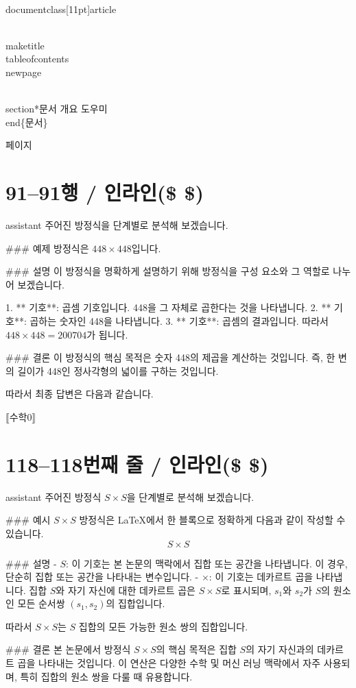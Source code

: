 \\documentclass[11pt]{article}
\begin{document}
\\maketitle
\\tableofcontents
\\newpage

\\section*{문서 개요}
도우미
\\end\{문서\}

\새 페이지

\section*{91–91행 / 인라인(\$ \$) }
assistant
주어진 방정식을 단계별로 분석해 보겠습니다.

### 예제
방정식은 \(448 \times 448\)입니다.

### 설명
이 방정식을 명확하게 설명하기 위해 방정식을 구성 요소와 그 역할로 나누어 보겠습니다.

1. ** 기호**: 곱셈 기호입니다. 448을 그 자체로 곱한다는 것을 나타냅니다.
2. ** 기호**: 곱하는 숫자인 448을 나타냅니다.
3. ** 기호**: 곱셈의 결과입니다. 따라서 \(448 \times 448 = 200704\)가 됩니다.

### 결론
이 방정식의 핵심 목적은 숫자 448의 제곱을 계산하는 것입니다. 즉, 한 변의 길이가 448인 정사각형의 넓이를 구하는 것입니다.

따라서 최종 답변은 다음과 같습니다.

⟦수학0⟧

\section*{118–118번째 줄 / 인라인(\$ \$) }
assistant
주어진 방정식 \( S \times S \)을 단계별로 분석해 보겠습니다.

### 예시
\( S \times S \) 방정식은 LaTeX에서 한 블록으로 정확하게 다음과 같이 작성할 수 있습니다.
\[ S \times S \]

### 설명
- \( S \): 이 기호는 본 논문의 맥락에서 집합 또는 공간을 나타냅니다. 이 경우, 단순히 집합 또는 공간을 나타내는 변수입니다.
- \( \times \): 이 기호는 데카르트 곱을 나타냅니다. 집합 \( S \)와 자기 자신에 대한 데카르트 곱은 \( S \times S \)로 표시되며, \( s_1 \)와 \( s_2 \)가 \( S \)의 원소인 모든 순서쌍 \((s_1, s_2)\)의 집합입니다.

따라서 \( S \times S \)는 \( S \) 집합의 모든 가능한 원소 쌍의 집합입니다.

### 결론
본 논문에서 방정식 \( S \times S \)의 핵심 목적은 집합 \( S \)의 자기 자신과의 데카르트 곱을 나타내는 것입니다. 이 연산은 다양한 수학 및 머신 러닝 맥락에서 자주 사용되며, 특히 집합의 원소 쌍을 다룰 때 유용합니다.
\end{document}
